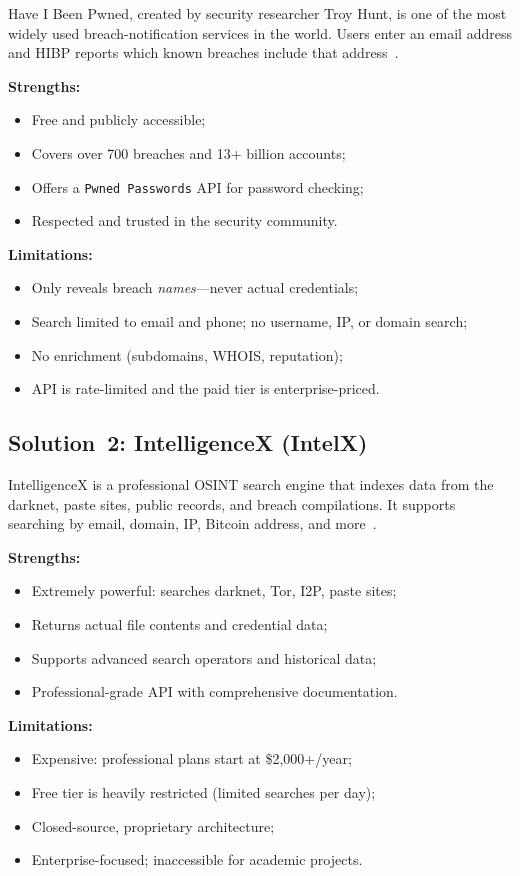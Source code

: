 Have I Been Pwned, created by security researcher Troy Hunt, is one of the
most widely used breach-notification services in the world. Users enter an
email address and HIBP reports which known breaches include that
address~\cite{hibp}.

\textbf{Strengths:}
\begin{itemize}[nosep]
  \item Free and publicly accessible;
  \item Covers over 700 breaches and 13+ billion accounts;
  \item Offers a \texttt{Pwned Passwords} API for password checking;
  \item Respected and trusted in the security community.
\end{itemize}

\textbf{Limitations:}
\begin{itemize}[nosep]
  \item Only reveals breach \emph{names}---never actual credentials;
  \item Search limited to email and phone; no username, IP, or domain search;
  \item No enrichment (subdomains, WHOIS, reputation);
  \item API is rate-limited and the paid tier is enterprise-priced.
\end{itemize}

\subsection{Solution~2: IntelligenceX (IntelX)}

IntelligenceX is a professional OSINT search engine that indexes data from
the darknet, paste sites, public records, and breach compilations. It
supports searching by email, domain, IP, Bitcoin address, and
more~\cite{intelx}.

\textbf{Strengths:}
\begin{itemize}[nosep]
  \item Extremely powerful: searches darknet, Tor, I2P, paste sites;
  \item Returns actual file contents and credential data;
  \item Supports advanced search operators and historical data;
  \item Professional-grade API with comprehensive documentation.
\end{itemize}

\textbf{Limitations:}
\begin{itemize}[nosep]
  \item Expensive: professional plans start at \$2,000+/year;
  \item Free tier is heavily restricted (limited searches per day);
  \item Closed-source, proprietary architecture;
  \item Enterprise-focused; inaccessible for academic projects.
\end{itemize}

